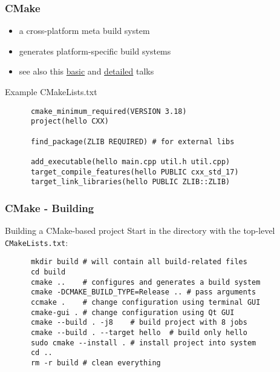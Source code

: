 \begin{frame}[fragile]
  \frametitle{CMake}
  \begin{block}{}
    \begin{itemize}
      \item a cross-platform meta build system
      \item generates platform-specific build systems
      \item see also this \href{https://www.youtube.com/watch?v=eC9-iRN2b04}{basic} and \href{https://www.youtube.com/watch?v=bsXLMQ6WgIk}{detailed} talks
    \end{itemize}
  \end{block}
  \begin{block}{Example CMakeLists.txt}
    \begin{verbatim}
      cmake_minimum_required(VERSION 3.18)
      project(hello CXX)

      find_package(ZLIB REQUIRED) # for external libs

      add_executable(hello main.cpp util.h util.cpp)
      target_compile_features(hello PUBLIC cxx_std_17)
      target_link_libraries(hello PUBLIC ZLIB::ZLIB)
    \end{verbatim}
  \end{block}
\end{frame}

\begin{frame}[fragile]
  \frametitle{CMake - Building}
  \begin{block}{Building a CMake-based project}
    Start in the directory with the top-level \texttt{CMakeLists.txt}:
    \begin{verbatim}
      mkdir build # will contain all build-related files
      cd build
      cmake ..    # configures and generates a build system
      cmake -DCMAKE_BUILD_TYPE=Release .. # pass arguments
      ccmake .    # change configuration using terminal GUI
      cmake-gui . # change configuration using Qt GUI
      cmake --build . -j8    # build project with 8 jobs
      cmake --build . --target hello  # build only hello
      sudo cmake --install . # install project into system
      cd ..
      rm -r build # clean everything
    \end{verbatim}
  \end{block}
\end{frame}

